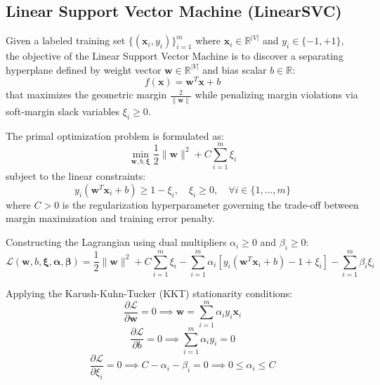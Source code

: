 \subsection{Linear Support Vector Machine (LinearSVC)}
Given a labeled training set $\{(\mathbf{x}_i, y_i)\}_{i=1}^m$ where $\mathbf{x}_i \in \mathbb{R}^{|V|}$ and $y_i \in \{-1, +1\}$, the objective of the Linear Support Vector Machine is to discover a separating hyperplane defined by weight vector $\mathbf{w} \in \mathbb{R}^{|V|}$ and bias scalar $b \in \mathbb{R}$:
\begin{equation}
    f(\mathbf{x}) = \mathbf{w}^T \mathbf{x} + b
\end{equation}
that maximizes the geometric margin $\frac{2}{\|\mathbf{w}\|}$ while penalizing margin violations via soft-margin slack variables $\xi_i \ge 0$.

The primal optimization problem is formulated as:
\begin{equation}
    \min_{\mathbf{w}, b, \bm{\xi}} \frac{1}{2} \|\mathbf{w}\|^2 + C \sum_{i=1}^m \xi_i
    \label{eq:svm_primal}
\end{equation}
subject to the linear constraints:
\begin{equation}
    y_i (\mathbf{w}^T \mathbf{x}_i + b) \ge 1 - \xi_i, \quad \xi_i \ge 0, \quad \forall i \in \{1, \dots, m\}
\end{equation}
where $C > 0$ is the regularization hyperparameter governing the trade-off between margin maximization and training error penalty.

Constructing the Lagrangian using dual multipliers $\alpha_i \ge 0$ and $\beta_i \ge 0$:
\begin{equation}
    \mathcal{L}(\mathbf{w}, b, \bm{\xi}, \bm{\alpha}, \bm{\beta}) = \frac{1}{2} \|\mathbf{w}\|^2 + C \sum_{i=1}^m \xi_i - \sum_{i=1}^m \alpha_i \left[ y_i (\mathbf{w}^T \mathbf{x}_i + b) - 1 + \xi_i \right] - \sum_{i=1}^m \beta_i \xi_i
\end{equation}

Applying the Karush-Kuhn-Tucker (KKT) stationarity conditions:
\begin{equation}
    \frac{\partial \mathcal{L}}{\partial \mathbf{w}} = 0 \implies \mathbf{w} = \sum_{i=1}^m \alpha_i y_i \mathbf{x}_i
\end{equation}
\begin{equation}
    \frac{\partial \mathcal{L}}{\partial b} = 0 \implies \sum_{i=1}^m \alpha_i y_i = 0
\end{equation}
\begin{equation}
    \frac{\partial \mathcal{L}}{\partial \xi_i} = 0 \implies C - \alpha_i - \beta_i = 0 \implies 0 \le \alpha_i \le C
\end{equation}

